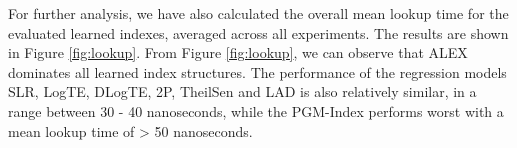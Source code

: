 \documentclass[sigconf]{acmart}
\begin{document}
For further analysis, we have also calculated the overall mean
lookup time for the evaluated learned indexes, averaged across
all experiments. The results are shown in Figure \ref{fig:lookup}. From Figure \ref{fig:lookup},
we can observe that ALEX dominates all learned index structures.
The performance of the regression models SLR, LogTE, DLogTE,
2P, TheilSen and LAD is also relatively similar, in a range between
30 - 40 nanoseconds, while the PGM-Index performs worst with a mean lookup time of >
50 nanoseconds.






\end{document}
